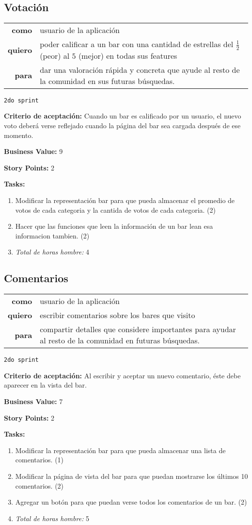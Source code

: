 \documentclass[hidelinks,a4paper,11pt, nofootinbib]{article}
\newcommand{\userstory}[3]{
\begin{tabular}{|r p{10cm}|}
  \hline
  \textbf{como} & #1 \\
  \textbf{quiero} & #2 \\
  \textbf{para} & #3 \\
  \hline
\end{tabular}

}
\newcommand{\critdeacep}[1]{\textbf{Criterio de aceptación:} #1

}
\newcommand{\busvalue}[1]{\textbf{Business Value:} #1

}
\newcommand{\storypoints}[1]{\textbf{Story Points:} #1

}
\newcommand{\segundosprint}{\texttt{2do sprint}

}
\newcommand{\tasks}[1]{\textbf{Tasks:} 

#1}
\begin{document}
\subsection*{Votación}
\userstory{usuario de la aplicación}{poder calificar a un bar con una cantidad de estrellas del $\frac{1}{2}$ (peor) al $5$ (mejor) en todas sus features}{dar una valoración rápida y concreta que ayude al resto de la comunidad en sus futuras búsquedas.}
\segundosprint
\critdeacep{Cuando un bar es calificado por un usuario, el nuevo voto deberá verse reflejado cuando la página del bar sea cargada después de ese momento.}
\busvalue{9}
\storypoints{2}
\tasks{
  \begin{enumerate}
    \item Modificar la representación bar para que pueda almacenar el promedio de votos de cada categoria y la cantida de votos de cada categoria. (2)
    \item Hacer que las funciones que leen la información de un bar lean esa informacion tambien. (2)
    \item[] \textit{Total de horas hombre:} 4
  \end{enumerate}
}

\subsection*{Comentarios}
\userstory{usuario de la aplicación}{escribir comentarios sobre los bares que visito}{compartir detalles que considere importantes para ayudar al resto de la comunidad en futuras búsquedas.}
\segundosprint
\critdeacep{Al escribir y aceptar un nuevo comentario, éste debe aparecer en la vista del bar.}
\busvalue{7}
\storypoints{2}
\tasks{
  \begin{enumerate}
    \item Modificar la representación bar para que pueda almacenar una lista de comentarios. (1)
    \item Modificar la página de vista del bar para que puedan mostrarse los últimos 10 comentarios. (2)
    \item Agregar un botón para que puedan verse todos los comentarios de un bar. (2)
    \item[] \textit{Total de horas hombre:} 5
  \end{enumerate}
}
\end{document}
